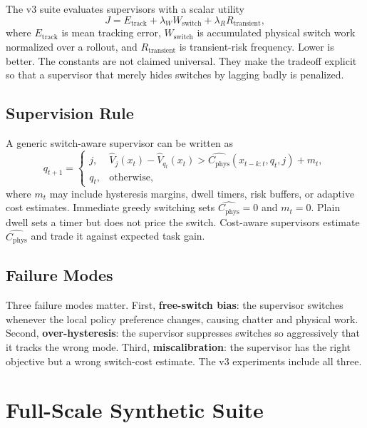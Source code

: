 \documentclass{article}
\newcommand{\phys}{C_{\mathrm{phys}}}
\newcommand{\state}{x}
\newcommand{\mode}{q}
\begin{document}
The v3 suite evaluates supervisors with a scalar utility
\begin{equation}
    J
    =
    E_{\mathrm{track}}
    +
    \lambda_W W_{\mathrm{switch}}
    +
    \lambda_R R_{\mathrm{transient}},
\end{equation}
where $E_{\mathrm{track}}$ is mean tracking error, $W_{\mathrm{switch}}$ is accumulated physical switch work normalized over a rollout, and $R_{\mathrm{transient}}$ is transient-risk frequency.
Lower is better.
The constants are not claimed universal.
They make the tradeoff explicit so that a supervisor that merely hides switches by lagging badly is penalized.

\subsection{Supervision Rule}

A generic switch-aware supervisor can be written as
\begin{equation}
    \mode_{t+1}
    =
    \begin{cases}
    j, & \widehat{V}_j(\state_t)-\widehat{V}_{\mode_t}(\state_t) >
    \widehat{\phys}(\state_{t-k:t},\mode_t,j) + m_t, \\
    \mode_t, & \text{otherwise},
    \end{cases}
\end{equation}
where $m_t$ may include hysteresis margins, dwell timers, risk buffers, or adaptive cost estimates.
Immediate greedy switching sets $\widehat{\phys}=0$ and $m_t=0$.
Plain dwell sets a timer but does not price the switch.
Cost-aware supervisors estimate $\widehat{\phys}$ and trade it against expected task gain.

\subsection{Failure Modes}

Three failure modes matter.
First, \textbf{free-switch bias}: the supervisor switches whenever the local policy preference changes, causing chatter and physical work.
Second, \textbf{over-hysteresis}: the supervisor suppresses switches so aggressively that it tracks the wrong mode.
Third, \textbf{miscalibration}: the supervisor has the right objective but a wrong switch-cost estimate.
The v3 experiments include all three.

\section{Full-Scale Synthetic Suite}
\end{document}
